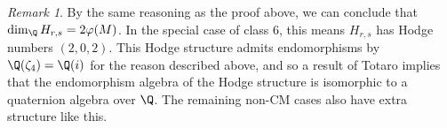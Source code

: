 \documentclass[12pt]{amsart}
\theoremstyle{definition}
\theoremstyle{remark}
\newtheorem{remark}{Remark}
\begin{document}
\begin{remark}
    By the same reasoning as the proof above, we can conclude that $\dim_{\Q}H_{r,s}=2\varphi(M)$. In the special case of class 6, this means $H_{r,s}$ has Hodge numbers $(2,0,2)$. This Hodge structure admits endomorphisms by $\Q(\zeta_4)=\Q(i)$ for the reason described above, and so a result of Totaro \cite{totaro} implies that the endomorphism algebra of the Hodge structure is isomorphic to a quaternion algebra over $\Q$. The remaining non-CM cases also have extra structure like this.
\end{remark}






 




 

\end{document}
